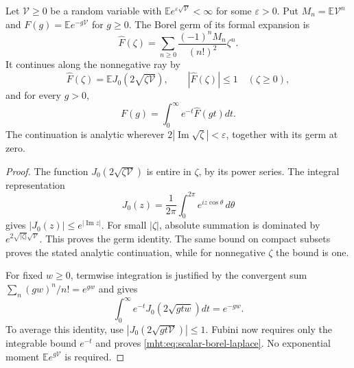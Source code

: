 \begin{lemma}\label{mht:lem:scalar-bessel-reconstruction}
Let $\mathcal V\geq0$ be a random variable with
$\mathbb E e^{\varepsilon\sqrt{\mathcal V}}<\infty$ for some $\varepsilon>0$.
Put $M_n=\mathbb E \mathcal V^n$ and
$F(g)=\mathbb E e^{-g\mathcal V}$ for $g\geq0$.
The Borel germ of its formal expansion is
\[
 \widehat F(\zeta)=\sum_{n\geq0}
             \frac{(-1)^nM_n}{(n!)^2}\zeta^n.
\]
It continues along the nonnegative ray by
\begin{equation}\label{mht:eq:scalar-bessel-transform}
 \widehat F(\zeta)=\mathbb E J_0(2\sqrt{\zeta \mathcal V}),\qquad
 |\widehat F(\zeta)|\leq1\quad(\zeta\geq0),
\end{equation}
and for every $g>0$,
\begin{equation}\label{mht:eq:scalar-borel-laplace}
 F(g)=\int_0^\infty e^{-t}\widehat F(gt)dt.
\end{equation}
The continuation is analytic wherever
$2|\operatorname{Im}\sqrt\zeta|<\varepsilon$, together with its
germ at zero.
\end{lemma}
\begin{proof}
The function $J_0(2\sqrt{\zeta \mathcal V})$ is entire in $\zeta$, by its
power series. The integral representation
\[
 J_0(z)=\frac1{2\pi}\int_0^{2\pi}e^{iz\cos\theta}\,d\theta
\]
gives $|J_0(z)|\leq e^{|\operatorname{Im}z|}$.
For small $|\zeta|$, absolute summation is dominated by
$e^{2\sqrt{|\zeta|}\sqrt{\mathcal V}}$. This proves the germ identity.
The same bound on compact subsets proves the stated analytic
continuation, while for nonnegative $\zeta$ the bound is one.

For fixed $w\geq0$, termwise integration is justified by the
convergent sum $\sum_n(gw)^n/n!=e^{gw}$ and gives
\[
 \int_0^\infty e^{-t}J_0(2\sqrt{gtw})dt=e^{-gw}.
\]
To average this identity, use $|J_0(2\sqrt{gt\mathcal V})|\leq1$.
Fubini now requires only the integrable bound $e^{-t}$ and proves
\eqref{mht:eq:scalar-borel-laplace}.
No exponential moment $\mathbb E e^{g\mathcal V}$ is required.
\end{proof}

